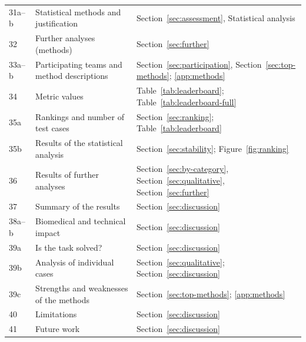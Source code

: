 \begin{table}[!p]
\begin{tabularx}{\textwidth}{l>{\raggedright\arraybackslash}p{}>{\raggedright\arraybackslash}X}
31a--b & Statistical methods and justification & Section~\ref{sec:assessment}, Statistical analysis \\
32 & Further analyses (methods) & Section~\ref{sec:further} \\
33a--b & Participating teams and method descriptions & Section~\ref{sec:participation}, Section~\ref{sec:top-methods}; \ref{app:methods} \\
34 & Metric values & Table~\ref{tab:leaderboard}; Table~\ref{tab:leaderboard-full} \\
35a & Rankings and number of test cases & Section~\ref{sec:ranking}; Table~\ref{tab:leaderboard} \\
35b & Results of the statistical analysis & Section~\ref{sec:stability}; Figure~\ref{fig:ranking} \\
36 & Results of further analyses & Section~\ref{sec:by-category}, Section~\ref{sec:qualitative}, Section~\ref{sec:further} \\
37 & Summary of the results & Section~\ref{sec:discussion} \\
38a--b & Biomedical and technical impact & Section~\ref{sec:discussion} \\
39a & Is the task solved? & Section~\ref{sec:discussion} \\
39b & Analysis of individual cases & Section~\ref{sec:qualitative}; Section~\ref{sec:discussion} \\
39c & Strengths and weaknesses of the methods & Section~\ref{sec:top-methods}; \ref{app:methods} \\
40 & Limitations & Section~\ref{sec:discussion} \\
41 & Future work & Section~\ref{sec:discussion} \\
\bottomrule
\end{tabularx}
\end{table}
